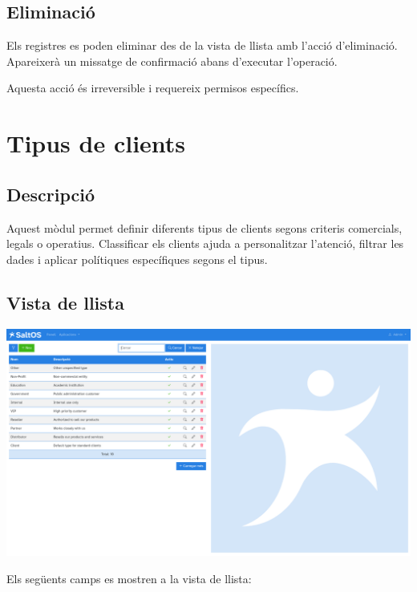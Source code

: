\documentclass[a4paper]{article}
\begin{document}
\hypertarget{toc50}{}
\subsection{Eliminació}

Els registres es poden eliminar des de la vista de llista amb l'acció d'eliminació.
Apareixerà un missatge de confirmació abans d'executar l'operació.

Aquesta acció és irreversible i requereix permisos específics.


\hypertarget{toc51}{}
\section{Tipus de clients}

\hypertarget{toc52}{}
\subsection{Descripció}

Aquest mòdul permet definir diferents tipus de clients segons criteris comercials, legals o operatius.
Classificar els clients ajuda a personalitzar l’atenció, filtrar les dades i aplicar polítiques específiques segons el tipus.

\hypertarget{toc53}{}
\subsection{Vista de llista}

\begin{center}\includegraphics[width=1\textwidth]{../ujest/snaps/test-screenshots-js-screenshots-crm-customers-types-list-ca-es-1-snap.png}\end{center}

Els següents camps es mostren a la vista de llista:
\end{document}
